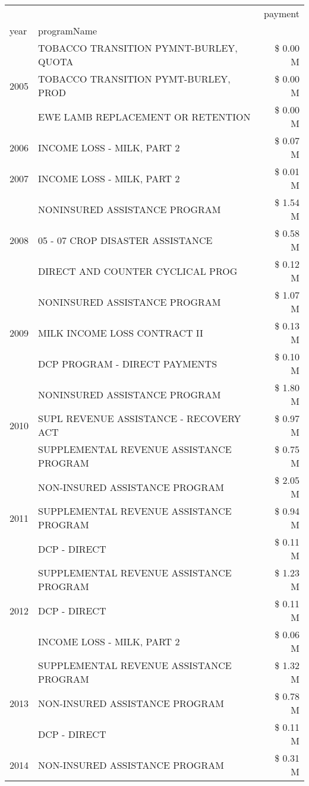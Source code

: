 \begin{tabular}{llr}
\toprule
 &  & payment \\
year & programName &  \\
\midrule
\multirow[t]{3}{*}{2005} & TOBACCO TRANSITION PYMNT-BURLEY, QUOTA & \$ 0.00 M \\
 & TOBACCO TRANSITION PYMT-BURLEY, PROD & \$ 0.00 M \\
 & EWE LAMB REPLACEMENT OR RETENTION & \$ 0.00 M \\
\cline{1-3}
2006 & INCOME LOSS - MILK, PART 2 & \$ 0.07 M \\
\cline{1-3}
2007 & INCOME LOSS - MILK, PART 2 & \$ 0.01 M \\
\cline{1-3}
\multirow[t]{3}{*}{2008} & NONINSURED ASSISTANCE PROGRAM & \$ 1.54 M \\
 & 05 - 07 CROP DISASTER ASSISTANCE & \$ 0.58 M \\
 & DIRECT AND COUNTER CYCLICAL PROG & \$ 0.12 M \\
\cline{1-3}
\multirow[t]{3}{*}{2009} & NONINSURED ASSISTANCE PROGRAM & \$ 1.07 M \\
 & MILK INCOME LOSS CONTRACT II & \$ 0.13 M \\
 & DCP PROGRAM - DIRECT PAYMENTS & \$ 0.10 M \\
\cline{1-3}
\multirow[t]{3}{*}{2010} & NONINSURED ASSISTANCE PROGRAM & \$ 1.80 M \\
 & SUPL REVENUE ASSISTANCE - RECOVERY ACT & \$ 0.97 M \\
 & SUPPLEMENTAL REVENUE ASSISTANCE PROGRAM & \$ 0.75 M \\
\cline{1-3}
\multirow[t]{3}{*}{2011} & NON-INSURED ASSISTANCE PROGRAM & \$ 2.05 M \\
 & SUPPLEMENTAL REVENUE ASSISTANCE PROGRAM & \$ 0.94 M \\
 & DCP - DIRECT & \$ 0.11 M \\
\cline{1-3}
\multirow[t]{3}{*}{2012} & SUPPLEMENTAL REVENUE ASSISTANCE PROGRAM & \$ 1.23 M \\
 & DCP - DIRECT & \$ 0.11 M \\
 & INCOME LOSS - MILK, PART 2 & \$ 0.06 M \\
\cline{1-3}
\multirow[t]{3}{*}{2013} & SUPPLEMENTAL REVENUE ASSISTANCE PROGRAM & \$ 1.32 M \\
 & NON-INSURED ASSISTANCE PROGRAM & \$ 0.78 M \\
 & DCP - DIRECT & \$ 0.11 M \\
\cline{1-3}
\multirow[t]{3}{*}{2014} & NON-INSURED ASSISTANCE PROGRAM & \$ 0.31 M \\

\end{tabular}
